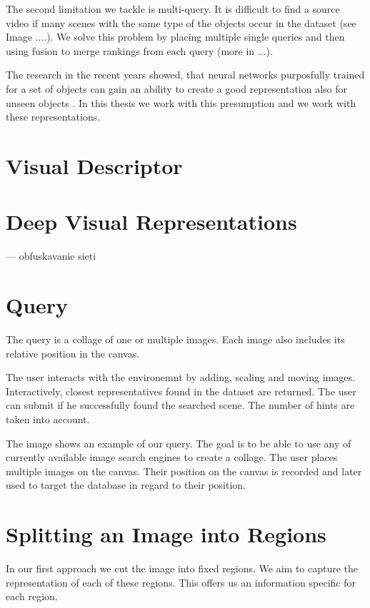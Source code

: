 The second limitation we tackle is multi-query. It is difficult to find a source video if many scenes with the same type of the objects occur in the dataset (see Image ....). We solve this problem by placing multiple single queries and then using fusion to merge rankings from each query (more in ...).


The research in the recent years showed, that neural networks purposfully trained for a set of objects can gain an ability to create a good representation also for unseen objects . In this thesis we work with this presumption and we work with these representations.

\section{Visual Descriptor}
\section{Deep Visual Representations}
--- obfuskavanie sieti

\section{Query}

The query is a collage of one or multiple images. Each image also includes its relative position in the canvas.

The user interacts with the environemnt by adding, scaling and moving images. Interactively, closest representatives found in the dataset are returned. The user can submit if he successfully found the searched scene. The number of hints are taken into account.

The image  shows an example of our query. The goal is to be able to use any of currently available image search engines to create a collage. The user places multiple images on the canvas. Their position on the canvas is recorded and later used to target the database in regard to their position. 


\section{Splitting an Image into Regions}



In our first approach we cut the image into fixed regions. We aim to capture the 
representation of each of these regions. This offers us an information specific for each region.

